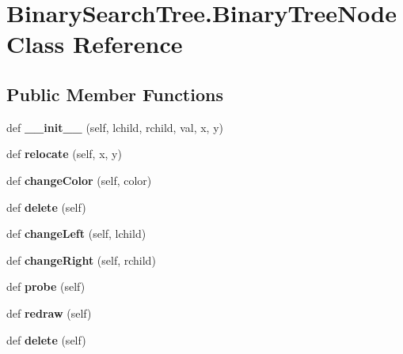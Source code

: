 \hypertarget{class_binary_search_tree_1_1_binary_tree_node}{}\section{Binary\+Search\+Tree.\+Binary\+Tree\+Node Class Reference}
\label{class_binary_search_tree_1_1_binary_tree_node}
\subsection*{Public Member Functions}
\begin{DoxyCompactItemize}
\item 
\mbox{\label{class_binary_search_tree_1_1_binary_tree_node_a82eeb27919e933cb0bbab2bb19a4674a}} 
def {\bfseries \+\_\+\+\_\+init\+\_\+\+\_\+} (self, lchild, rchild, val, x, y)
\item 
\mbox{\label{class_binary_search_tree_1_1_binary_tree_node_aa7b30f6a083e5eb57d4048c6a83bfff1}} 
def {\bfseries relocate} (self, x, y)
\item 
\mbox{\label{class_binary_search_tree_1_1_binary_tree_node_ab9dc94fd42e8ef8e1d7f5d5e62bb613a}} 
def {\bfseries change\+Color} (self, color)
\item 
\mbox{\label{class_binary_search_tree_1_1_binary_tree_node_a4697a030e64bcc4abf33c3c1e10febbd}} 
def {\bfseries delete} (self)
\item 
\mbox{\label{class_binary_search_tree_1_1_binary_tree_node_af69ab5e5100d035c4808ce89e2e6e835}} 
def {\bfseries change\+Left} (self, lchild)
\item 
\mbox{\label{class_binary_search_tree_1_1_binary_tree_node_a630b102ad6c1ccbdca6fd3b8f19260db}} 
def {\bfseries change\+Right} (self, rchild)
\item 
\mbox{\label{class_binary_search_tree_1_1_binary_tree_node_a4be9ddca35a93613097f04ce6be9847c}} 
def {\bfseries probe} (self)
\item 
\mbox{\label{class_binary_search_tree_1_1_binary_tree_node_a13edd0042d0de74ee2a9183c2ee4f73b}} 
def {\bfseries redraw} (self)
\item 
\mbox{\label{class_binary_search_tree_1_1_binary_tree_node_a4697a030e64bcc4abf33c3c1e10febbd}} 
def {\bfseries delete} (self)
\end{DoxyCompactItemize}
